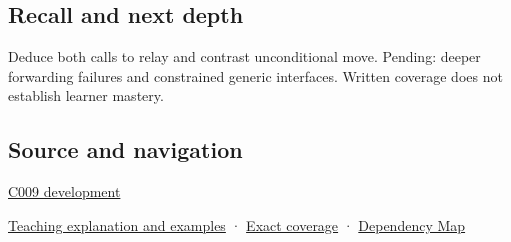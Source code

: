 \subsection{Recall and next depth}\label{appendix-0104b704fb11-recall-and-next-depth}

Deduce both calls to relay and contrast unconditional move. Pending: deeper forwarding failures and constrained generic interfaces. Written coverage does not establish learner mastery.

\subsection{Source and navigation}\label{appendix-0104b704fb11-source-and-navigation}

\hyperref[appendix-fd090d982a15-m009---parts-127-147]{C009 development}

\hyperref[01-foundations-i-ch003-move-permission-is-not-resource-transfer]{Teaching explanation and examples} · \hyperref[appendix-fd090d982a15-m008---parts-113-126]{Exact coverage} · \hyperref[appendix-4ad47bdd269a]{Dependency Map}
